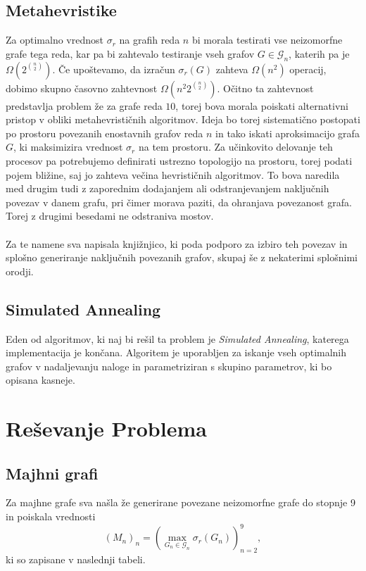 \documentclass[ letterpaper, titlepage, fleqn]{article}
\begin{document}
\subsection{Metahevristike}
Za optimalno vrednost $\sigma_r$ na grafih reda $n$ bi morala testirati vse neizomorfne
grafe tega reda, kar pa bi zahtevalo testiranje vseh grafov $G \in \mathscr{G}_n$, 
katerih pa je $\Omega(2^{\binom{n}{2}})$. Če upoštevamo, da izračun $\sigma_r(G)$ 
zahteva $\Omega(n^2)$ operacij, dobimo skupno časovno zahtevnost $\Omega(n^2 2^{\binom{n}{2}})$.
Očitno ta zahtevnost predstavlja problem že za grafe reda $10$, 
torej bova morala poiskati alternativni pristop v obliki metahevrističnih algoritmov.
Ideja bo torej sistematično postopati po prostoru povezanih enostavnih grafov reda $n$ in 
tako iskati aproksimacijo grafa $G$, ki maksimizira vrednost $\sigma_r$ na tem prostoru.
Za učinkovito delovanje teh procesov pa potrebujemo definirati ustrezno topologijo 
na prostoru, torej podati pojem bližine, saj jo zahteva večina hevrističnih algoritmov.
To bova naredila med drugim tudi z zaporednim dodajanjem ali odstranjevanjem naključnih povezav v 
danem grafu, pri čimer morava paziti, da ohranjava povezanost grafa. 
Torej z drugimi besedami ne odstraniva mostov.
\\\\
Za te namene sva napisala knjižnjico, ki poda podporo za izbiro teh povezav
in splošno generiranje naključnih povezanih grafov, skupaj še z nekaterimi splošnimi orodji.

\subsection{Simulated Annealing}
Eden od algoritmov, ki naj bi rešil ta problem je {\em Simulated Annealing}, 
katerega implementacija je končana.
Algoritem je uporabljen za iskanje vseh optimalnih grafov v nadaljevanju naloge in parametriziran
s skupino parametrov, ki bo opisana kasneje.

\section{Reševanje Problema}

\subsection{Majhni grafi}
Za majhne grafe sva našla že generirane povezane neizomorfne grafe do stopnje 9 in poiskala vrednosti 
$$(M_n)_{n} = (\max_{G_n \in \mathscr{G}_n} \sigma_r(G_n))_{n=2}^9,$$
ki so zapisane v naslednji tabeli.
\end{document}
